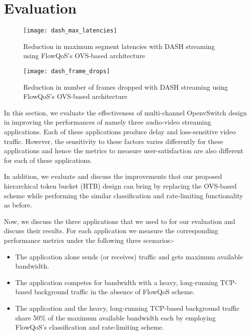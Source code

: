 \section{Evaluation}
\label{sec:evaluation}


\begin{figure}[t]
    \texttt{[image: dash\_max\_latencies]}
    \caption{Reduction in maximum segment latencies with DASH streaming using FlowQoS's OVS-based architecture}
    \centering
    \label{fig:dash_max}
\end{figure}
 
\begin{figure}[t]
    \texttt{[image: dash\_frame\_drops]}
    \caption{Reduction in number of frames dropped with DASH streaming using FlowQoS's OVS-based architecture}
    \centering
    \label{fig:dash_frame}
\end{figure}

In this section, we evaluate the effectiveness of multi-channel OpenvSwitch design in improving the performances of namely three audio-video streaming applications. Each of these applications produce delay and loss-sensitive video traffic. However, the sensitivity to these factors varies differently for these applications and hence the metrics to measure user-satisfaction are also different for each of these applications.

In addition, we evaluate and discuss the improvements that our proposed hierarchical token bucket (HTB) design can bring by replacing the OVS-based scheme while performing the similar classification and rate-limiting functionality as before.

Now, we discuss the three applications that we used to for our evaluation and discuss their results. For each application we measure the corresponding performance metrics under the following three scenarios:-

\begin{itemize}
\item The application alone sends (or receives) traffic and gets maximum available bandwidth.
\item The application competes for bandwidth with a heavy, long-running TCP-based background traffic in the absence of FlowQoS scheme.
\item The application and the heavy, long-running TCP-based background traffic share 50\% of the maximum available bandwidth each by employing FlowQoS's classification and rate-limiting scheme.
\end{itemize}

